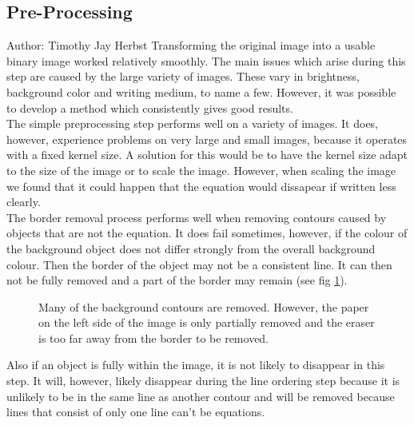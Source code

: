 \documentclass[11pt]{article}
\begin{document}
	\subsection{Pre-Processing}
	\small{Author: Timothy Jay Herbst} \newline \newline
	Transforming the original image into a usable binary image worked relatively smoothly.
	The main issues which arise during this step are caused by the large variety of images.
	These vary in brightness, background color and writing medium, to name a few.
	However, it was possible to develop a method which consistently gives good results.\\
	The simple preprocessing step performs well on a variety of images.
	It does, however, experience problems on very large and small images, because it operates with a fixed kernel size.
	A solution for this would be to have the kernel size adapt to the size of the image or to scale the image.
	However, when scaling the image we found that it could happen that the equation would dissapear if written less clearly.\\
	The border removal process performs well when removing contours caused by objects that are not the equation.
	It does fail sometimes, however, if the colour of the background object does not differ strongly from the overall background colour.
	Then the border of the object may not be a consistent line.
	It can then not be fully removed and a part of the border may remain (see fig \ref{fig:PartialBorder}).
	\begin{figure}[htp]
		\centering
		\quad%
		
		\caption{Many of the background contours are removed.
		However, the paper on the left side of the image is only partially removed and the eraser is too far away from the border to be removed.}
		\label{fig:PartialBorder}
	\end{figure}
	Also if an object is fully within the image, it is not likely to disappear in this step.
	It will, however, likely disappear during the line ordering step because it is unlikely to be in the same line as another contour and will be removed because lines that consist of only one line can't be equations.\\
	
\end{document}
